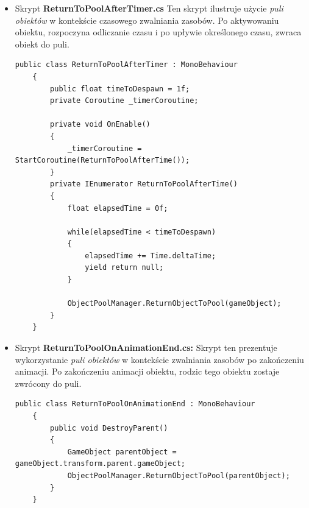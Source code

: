 \begin{itemize}
    \item Skrypt \textbf{ReturnToPoolAfterTimer.cs} Ten skrypt ilustruje użycie \textit{puli obiektów} w kontekście czasowego zwalniania zasobów. Po aktywowaniu obiektu, rozpoczyna odliczanie czasu i po upływie określonego czasu, zwraca obiekt do puli.
    \begin{codebox}
    \begin{lstlisting}[language={[Sharp]C}, label={listing:ReturnToPoolAfterTimer.cs}]
    public class ReturnToPoolAfterTimer : MonoBehaviour
    {
        public float timeToDespawn = 1f;
        private Coroutine _timerCoroutine;

        private void OnEnable()
        {
            _timerCoroutine = StartCoroutine(ReturnToPoolAfterTime());
        }
        private IEnumerator ReturnToPoolAfterTime()
        {
            float elapsedTime = 0f;

            while(elapsedTime < timeToDespawn)
            {
                elapsedTime += Time.deltaTime;
                yield return null;
            }

            ObjectPoolManager.ReturnObjectToPool(gameObject);
        }
    }
    \end{lstlisting}
    \end{codebox}
\end{itemize}
\begin{itemize}
    \item Skrypt \textbf{ReturnToPoolOnAnimationEnd.cs:} Skrypt ten prezentuje wykorzystanie \textit{puli obiektów} w kontekście zwalniania zasobów po zakończeniu animacji. Po zakończeniu animacji obiektu, rodzic tego obiektu zostaje zwrócony do puli.
    \begin{codebox}
    \begin{lstlisting}[language={[Sharp]C}, label={listing:ReturnToPoolOnAnimationEnd.cs}]
    public class ReturnToPoolOnAnimationEnd : MonoBehaviour
    {
        public void DestroyParent()
        {
            GameObject parentObject = gameObject.transform.parent.gameObject;
            ObjectPoolManager.ReturnObjectToPool(parentObject);
        }
    }
    \end{lstlisting}
    \end{codebox}
\end{itemize}
